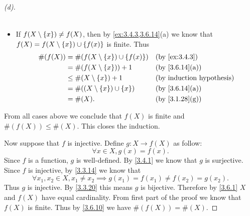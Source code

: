 \begin{proof}[(d)]
\begin{itemize}
\begin{align*}
		      \end{align*}
		\item If \(f(X \setminus \left\lbrace x\right\rbrace) \neq f(X)\), then by \cref{ex:3.4.3,3.6.14}(a) we know that \(f(X) = f(X \setminus \left\lbrace x\right\rbrace) \cup \left\lbrace f(x)\right\rbrace\) is finite.
		      Thus
		      \begin{align*}
			      \#(f(X)) & = \#(f(X \setminus \set{x}) \cup \set{f(x)}) &  & \by{ex:3.4.3}                \\
			               & = \#(f(X \setminus \set{x})) + 1             &  & \text{(by \cref{3.6.14}(a))} \\
			               & \leq \#(X \setminus \set{x}) + 1             &  & \byIH                        \\
			               & = \#((X \setminus \set{x}) \cup \set{x})     &  & \text{(by \cref{3.6.14}(a))} \\
			               & = \#(X).                                     &  & \text{(by \cref{3.1.28}(g))}
		      \end{align*}
	\end{itemize}
	From all cases above we conclude that \(f(X)\) is finite and \(\#(f(X)) \leq \#(X)\).
	This closes the induction.

	Now suppose that \(f\) is injective.
	Define \(g : X \to f(X)\) as follow:
	\[
		\forall x \in X, g(x) = f(x).
	\]
	Since \(f\) is a function, \(g\) is well-defined.
	By \cref{3.4.1} we know that \(g\) is surjective.
	Since \(f\) is injective, by \cref{3.3.14} we know that
	\[
		\forall x_1, x_2 \in X, x_1 \neq x_2 \implies g(x_1) = f(x_1) \neq f(x_2) = g(x_2).
	\]
	Thus \(g\) is injective.
	By \cref{3.3.20} this means \(g\) is bijective.
	Therefore by \cref{3.6.1} \(X\) and \(f(X)\) have equal cardinality.
	From first part of the proof we know that \(f(X)\) is finite.
	Thus by \cref{3.6.10} we have \(\#(f(X)) = \#(X)\).
\end{proof}


